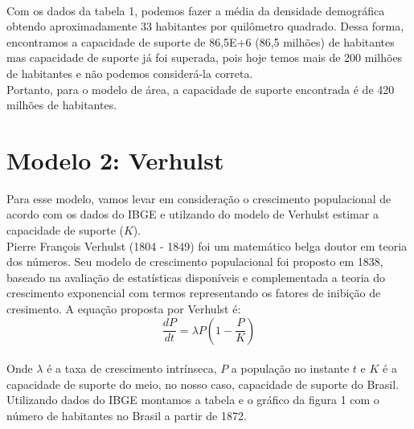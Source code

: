 \documentclass[a4paper]{article}
\begin{document}
\\
Com os dados da tabela 1, podemos fazer a m\'{e}dia da densidade demogr\'{a}fica obtendo aproximadamente 33 habitantes por quil\^{o}metro quadrado. Dessa forma, encontramos a capacidade de suporte de 86,5E+6 (86,5 milh\~{o}es) de habitantes mas capacidade de suporte j\'{a} foi superada, pois hoje temos mais de 200 milh\~{o}es de habitantes e n\~{a}o podemos consider\'{a}-la correta. 
\\
Portanto, para o modelo de \'{a}rea, a capacidade de suporte encontrada \'{e} de 420 milh\~{o}es de habitantes.
\\ 
\section{Modelo 2: Verhulst}
Para esse modelo, vamos levar em considera\c{c}\~{a}o o crescimento populacional de acordo com os dados do IBGE e utilzando do modelo de Verhulst estimar a capacidade de suporte ($K$).
\\
Pierre Fran\c{c}ois Verhulst (1804 - 1849) foi um  matem\'{a}tico belga doutor em teoria dos n\'{u}meros. Seu modelo de crescimento populacional foi proposto em 1838, baseado na avalia\c{c}\~{a}o de estat\'{i}sticas dispon\'{i}veis e complementada a teoria do crescimento exponencial com termos representando os fatores de inibi\c{c}\~{a}o de cresimento. A equa\c{c}\~{a}o proposta por Verhulst \'{e}:
\begin{equation}
\frac{dP}{dt}= \lambda P(1 - \frac{P}{K})
\end{equation}
\\
Onde $\lambda$ \'{e} a taxa de crescimento intr\'{i}nseca, $P$ a popula\c{c}\~{a}o no instante $t$ e $K$ \'{e} a capacidade de suporte do meio, no nosso caso, capacidade de suporte do Brasil.
\\
Utilizando dados do IBGE montamos a tabela e o gr\'{a}fico da figura 1 com o n\'{u}mero de habitantes no Brasil a partir de 1872. 
\end{document}
